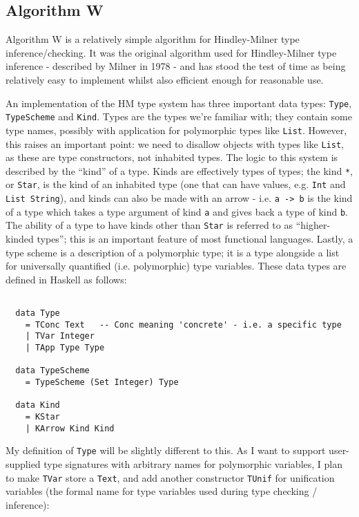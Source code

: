 \documentclass[9pt]{extarticle}
\begin{document}
\subsection{Algorithm W}

Algorithm W is a relatively simple algorithm for Hindley-Milner type
inference/checking. It was the original algorithm used for
Hindley-Milner type inference - described by Milner in 1978 - and has
stood the test of time as being relatively easy to implement whilst also
efficient enough for reasonable use.

An implementation of the HM type system has three important data types:
\verb'Type', \verb'TypeScheme' and \verb'Kind'. Types are the types
we're familiar with; they contain some type names, possibly with
application for polymorphic types like \verb'List'. However, this raises
an important point: we need to disallow objects with types like
\verb'List', as these are type constructors, not inhabited types. The
logic to this system is described by the ``kind'' of a type. Kinds are
effectively types of types; the kind \verb'*', or \verb'Star', is the
kind of an inhabited type (one that can have values, e.g. \verb'Int' and
\verb'List String'), and kinds can also be made with an arrow - i.e.
\verb'a -> b' is the kind of a type which takes a type argument of kind
\verb'a' and gives back a type of kind \verb'b'. The ability of a type
to have kinds other than \verb'Star' is referred to as ``higher-kinded
types''; this is an important feature of most functional languages.
Lastly, a type scheme is a description of a polymorphic type; it is a
type alongside a list for universally quantified (i.e. polymorphic) type
variables. These data types are defined in Haskell as follows:

\begin{verbatim}

  data Type
    = TConc Text   -- Conc meaning 'concrete' - i.e. a specific type
    | TVar Integer
    | TApp Type Type

  data TypeScheme
    = TypeScheme (Set Integer) Type

  data Kind
    = KStar
    | KArrow Kind Kind

\end{verbatim}

My definition of \verb'Type' will be slightly different to this. As I
want to support user-supplied type signatures with arbitrary names for
polymorphic variables, I plan to make \verb'TVar' store a \verb'Text',
and add another constructor \verb'TUnif' for unification variables (the
formal name for type variables used during type checking / inference):
\end{document}
